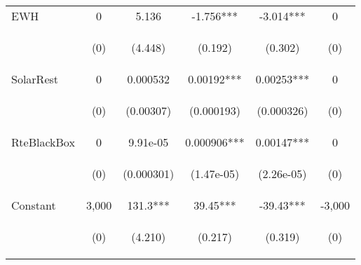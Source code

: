 \begin{center}
\begin{tabular}{lccccc}
EWH & 0 & 5.136 & -1.756*** & -3.014*** & 0 \\
\vspace{4pt} & \begin{footnotesize}(0)\end{footnotesize} & \begin{footnotesize}(4.448)\end{footnotesize} & \begin{footnotesize}(0.192)\end{footnotesize} & \begin{footnotesize}(0.302)\end{footnotesize} & \begin{footnotesize}(0)\end{footnotesize} \\
SolarRest & 0 & 0.000532 & 0.00192*** & 0.00253*** & 0 \\
\vspace{4pt} & \begin{footnotesize}(0)\end{footnotesize} & \begin{footnotesize}(0.00307)\end{footnotesize} & \begin{footnotesize}(0.000193)\end{footnotesize} & \begin{footnotesize}(0.000326)\end{footnotesize} & \begin{footnotesize}(0)\end{footnotesize} \\
RteBlackBox & 0 & 9.91e-05 & 0.000906*** & 0.00147*** & 0 \\
\vspace{4pt} & \begin{footnotesize}(0)\end{footnotesize} & \begin{footnotesize}(0.000301)\end{footnotesize} & \begin{footnotesize}(1.47e-05)\end{footnotesize} & \begin{footnotesize}(2.26e-05)\end{footnotesize} & \begin{footnotesize}(0)\end{footnotesize} \\
Constant & 3,000 & 131.3*** & 39.45*** & -39.43*** & -3,000 \\
 & \begin{footnotesize}(0)\end{footnotesize} & \begin{footnotesize}(4.210)\end{footnotesize} & \begin{footnotesize}(0.217)\end{footnotesize} & \begin{footnotesize}(0.319)\end{footnotesize} & \begin{footnotesize}(0)\end{footnotesize} \\

\end{tabular}
\end{center}
